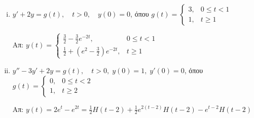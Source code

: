 \begin{enumerate}
    \begin{enumerate}[i)]
      \item $y'+2y=g(t),\quad t>0,\quad y(0)=0$, όπου $g(t)=\begin{cases}3, & 
          0\leq t<1 \\ 1, & t\geq 1\end{cases}$

        \hfill Απ: $y(t)=\begin{cases} \frac{3}{2}-\frac{3}{2}e^{-2t},& 0\leq t<1 \\ 
        \frac{1}{2}+\left(e^2-\frac{3}{2}\right)e^{-2t}, & t\geq 1\end{cases}$

      \item $y''-3y'+2y=g(t),\quad t>0,\; y(0)=1,\; y'(0)=0$, όπου 
        $g(t)=\begin{cases} 0, & 0\leq t<2 \\ 1, & t\geq 2\end{cases}$

        \hfill Απ: $y(t)=2e^t-e^{2t}=\frac{1}{2}H(t-2)+\frac{1}{2}e^{2(t-2)}
        H(t-2)-e^{t-2}H(t-2)$
    \end{enumerate}


\end{enumerate}
